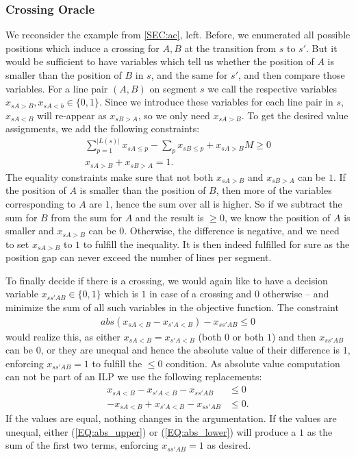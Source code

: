 \documentclass{llncs}
\begin{document}
\subsubsection{Crossing Oracle}
We reconsider the example from \ref{SEC:ac}, left. Before, we enumerated all possible positions which induce a crossing for $A, B$ at the transition from $s$ to $s'$. But it would be sufficient to have variables which tell us whether the position of $A$ is smaller than the position of $B$ in $s$, and the same for $s'$, and then compare those variables. For a line pair $(A,B)$ on segment $s$ we call the respective variables $x_{sA>B}, x_{sA<b} \in \{0, 1\}$. Since we introduce these variables for each line pair in $s$, $x_{sA<B}$ will re-appear as $x_{sB>A}$, so we only need $x_{sA>B}$. To get the desired value assignments, we add the following constraints:
\begin{gather}
	\sum_{p=1}^{|L(s)|} x_{sA\leq p} - \sum_{p} x_{sB\leq p} + x_{sA>B} M \geq 0 \\
	x_{sA>B} + x_{sB>A}=1.
\end{gather}
The equality constraints make sure that not both $x_{sA>B}$ and $x_{sB>A}$ can be $1$. If the position of $A$ is smaller than the position of $B$, then more of the variables corresponding to $A$ are $1$, hence the sum over all is higher. So if we subtract the sum for $B$ from the sum for $A$ and the result is $\geq 0$, we know the position of $A$ is  smaller and $x_{sA>B}$ can be $0$. Otherwise, the difference is negative, and we need to set $x_{sA>B}$ to $1$ to fulfill the inequality. It is then indeed fulfilled for sure as the position gap can never exceed the number of lines per segment.

To finally decide if there is a crossing, we would again like to have a decision variable $x_{ss'AB} \in \{0,1\}$ which is $1$ in case of a crossing and $0$ otherwise -- and minimize the sum of all such variables in the objective function.
The constraint
\begin{gather}
	abs(x_{sA<B}-x_{s'A<B}) - x_{ss'AB} \leq 0
\end{gather}
would realize this, as either $x_{sA<B} = x_{s'A<B}$ (both $0$ or both $1$) and then $x_{ss'AB}$ can be $0$, or they are unequal and hence the absolute value of their difference is $1$, enforcing $x_{ss'AB}=1$ to fulfill the $\leq 0$ condition. As absolute value computation can not be part of an ILP we use the following replacements:
\begin{align}
	x_{sA<B} - x_{s'A<B} - x_{ss'AB} &\leq 0 \label{EQ:abs_upper}\\
	-x_{sA<B} + x_{s'A<B} - x_{ss'AB} &\leq 0. \label{EQ:abs_lower}
\end{align}
If the values are equal, nothing changes in the argumentation. If the values are unequal, either (\ref{EQ:abs_upper}) or (\ref{EQ:abs_lower})  will produce a $1$ as the sum of the first two terms, enforcing $x_{ss'AB}=1$ as desired.
\end{document}
